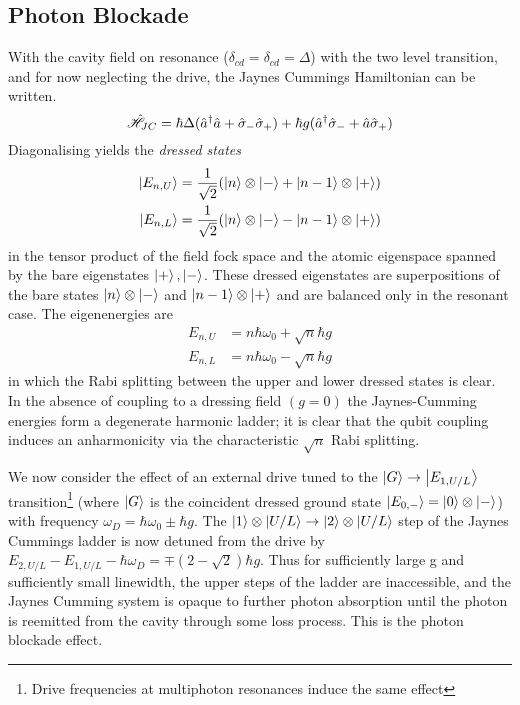 \subsection{Photon Blockade}
With the cavity field on resonance ($\delta_{cd} = \delta_{cd} = \Delta$) with the two level transition, and for now neglecting the drive, the Jaynes Cummings Hamiltonian can be written.
\begin{equation}
  \hat{\mathscr{H}}_{JC} = \hbar \Delta (\hat{a}^\dagger \hat{a} + \hat{\sigma}_- \hat{\sigma}_+) +\hbar g (\hat{a}^\dagger \hat{\sigma}_- + \hat{a} \hat{\sigma}_+)
\end{equation}
Diagonalising yields the \emph{dressed states}
\begin{align}
  \ket{E_{n, U}} & = \frac{1}{\sqrt{2}} (\ket{n} \otimes\ket{-}+\ket{n-1} \otimes\ket{+}) \\
  \ket{E_{n, L}} & = \frac{1}{\sqrt{2}} (\ket{n} \otimes\ket{-}-\ket{n-1} \otimes\ket{+})
\end{align}
in the tensor product of the field fock space and the atomic eigenspace spanned by the bare eigenstates $\ket{+}, \ket{-}$. These dressed eigenstates are superpositions of the bare states $\ket{n} \otimes\ket{-}$ and $\ket{n-1} \otimes\ket{+}$ and are balanced only in the resonant case. The eigenenergies are
\begin{align}
  E_{n, U} &= n \hbar \omega_0 + \sqrt{n} \hbar g \\
  E_{n, L} &= n \hbar \omega_0 - \sqrt{n} \hbar g
\end{align}
in which the Rabi splitting between the upper and lower dressed states is clear. In the absence of coupling to a dressing field $(g=0)$ the Jaynes-Cumming energies form a degenerate harmonic ladder; it is clear that the qubit coupling induces an anharmonicity via the characteristic $\sqrt{n}$ Rabi splitting.

We now consider the effect of an external drive tuned to the $\ket{G} \rightarrow \ket{E_{1, U/L}}$ transition\footnote{Drive frequencies at multiphoton resonances induce the same effect} (where $\ket{G}$ is the coincident dressed ground state $\ket{E_{0, -}} = \ket{0} \otimes\ket{-}$) with frequency $\omega_D = \hbar \omega_0 \pm \hbar g$.
The $\ket{1} \otimes\ket{U/L} \rightarrow \ket{2} \otimes\ket{U/L}$ step of the Jaynes Cummings ladder is now detuned from the drive by $E_{2, U/L} - E_{1, U/L} - \hbar \omega_D =  \mp(2-\sqrt{2}) \hbar g$. Thus for sufficiently large g and sufficiently small linewidth, the upper steps of the ladder are inaccessible, and the Jaynes Cumming system is opaque to further photon absorption until the photon is reemitted from the cavity through some loss process. This is the photon blockade effect.
